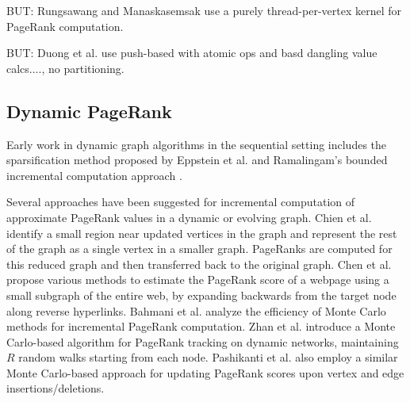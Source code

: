 BUT: Rungsawang and Manaskasemsak \cite{rank-rungsawang12} use a purely thread-per-vertex kernel for PageRank computation.

BUT: Duong et al. \cite{rank-duong12} use push-based with atomic ops and basd dangling value calcs...., no partitioning.




\subsection{Dynamic PageRank}

Early work in dynamic graph algorithms in the sequential setting includes the sparsification method proposed by Eppstein et al. \cite{graph-eppstein97} and Ramalingam's bounded incremental computation approach \cite{incr-ramalingam96}. Several approaches have been suggested for incremental computation of approximate PageRank values in a dynamic or evolving graph. Chien et al. \cite{rank-chien01} identify a small region near updated vertices in the graph and represent the rest of the graph as a single vertex in a smaller graph. PageRanks are computed for this reduced graph and then transferred back to the original graph. Chen et al. \cite{chen2004local} propose various methods to estimate the PageRank score of a webpage using a small subgraph of the entire web, by expanding backwards from the target node along reverse hyperlinks. Bahmani et al. \cite{bahmani2010fast} analyze the efficiency of Monte Carlo methods for incremental PageRank computation. Zhan et al. \cite{zhan2019fast} introduce a Monte Carlo-based algorithm for PageRank tracking on dynamic networks, maintaining $R$ random walks starting from each node. Pashikanti et al. \cite{rank-pashikanti22} also employ a similar Monte Carlo-based approach for updating PageRank scores upon vertex and edge insertions/deletions.

